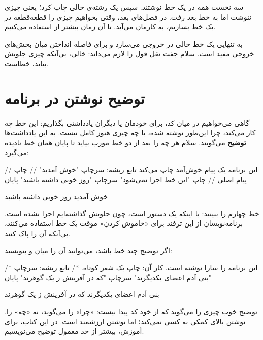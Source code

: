 سه  نخست همه در یک خط نوشتند. سپس  یک رشته‌ی
خالی چاپ کرد؛ یعنی چیزی ننوشت اما به خط بعد رفت.  در فصل‌های
بعد، وقتی بخواهیم چیزی را قطعه‌قطعه در یک خط بسازیم، به کارمان می‌آید. تا
آن زمان بیشتر از  استفاده می‌کنیم.

\begin{tip}
 به تنهایی یک خط خالی در خروجی می‌سازد و برای فاصله انداختن
میان بخش‌های خروجی مفید است. سلام جفت نقل قول را لازم می‌داند:
 خالی، بی‌آنکه چیزی جلویش بیاید، خطاست.
\end{tip}

\section{توضیح نوشتن در برنامه}

گاهی می‌خواهیم در میان کد، برای خودمان یا دیگران یادداشتی بگذاریم:
این خط چه کار می‌کند، چرا این‌طور نوشته شده، یا چه چیزی هنوز کامل نیست.
به این یادداشت‌ها \textbf{توضیح} می‌گویند. سلام هر چه را بعد از دو خط مورب
\code{//} بیاید تا پایان همان خط نادیده می‌گیرد:

\begin{salamfa}
// این برنامه یک پیام خوش‌آمد چاپ می‌کند
تابع ریشه:
    سرچاپ "خوش آمدید"    // چاپ پیام اصلی
    // چاپ "این خط اجرا نمی‌شود"
    سرچاپ "روز خوبی داشته باشید"
پایان
\end{salamfa}

\begin{outputfa}
خوش آمدید
روز خوبی داشته باشید
\end{outputfa}

خط چهارم را ببینید: با اینکه یک دستور  است، چون جلویش \code{//}
گذاشته‌ایم اجرا نشده است. برنامه‌نویسان از این ترفند برای «خاموش کردن»
موقت یک خط استفاده می‌کنند، بی‌آنکه آن را پاک کنند.

اگر توضیح چند خط باشد، می‌توانید آن را میان \code{/*} و \code{*/} بنویسید:

\begin{salamfa}
/*
   این برنامه را سارا نوشته است.
   کار آن: چاپ یک شعر کوتاه.
*/
تابع ریشه:
    سرچاپ "بنی آدم اعضای یکدیگرند"
    سرچاپ "که در آفرینش ز یک گوهرند"
پایان
\end{salamfa}

\begin{outputfa}
بنی آدم اعضای یکدیگرند
که در آفرینش ز یک گوهرند
\end{outputfa}

\begin{tip}
توضیح خوب چیزی را می‌گوید که از خود کد پیدا نیست: «چرا» را می‌گوید، نه
«چه» را. نوشتن  بالای  کمکی به کسی
نمی‌کند؛ اما نوشتن 
ارزشمند است. در این کتاب، برای آموزش، بیشتر از حد معمول توضیح می‌نویسیم.
\end{tip}

